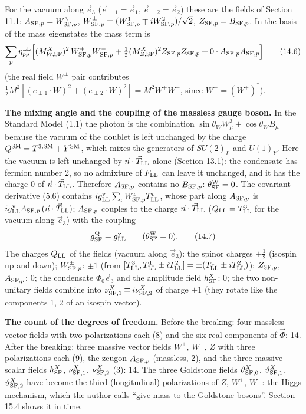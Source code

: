 \documentclass[
  10pt,
]{article}
\begin{document}
For the vacuum along \(\vec e_3\) (\(\vec e_{\perp1}=\vec e_1\),
\(\vec e_{\perp2}=\vec e_2\)) these are the fields of Section 11.1:
\(A_{{\rm SF},p}=W^3_{{\rm SF},p}\),
\(W^\pm_{{\rm SF},p}=(W^1_{{\rm SF},p}\mp iW^2_{{\rm SF},p})/\sqrt2\),
\(Z_{{\rm SF},p}=B_{{\rm SF},p}\). In the basis of the mass eigenstates
the mass term is
\[\sum_p\eta^{\rm LL}_{pp}\Big[(M^X_{W,{\rm SF}})^2\,W^+_{{\rm SF},p}W^-_{{\rm SF},p}+\tfrac12(M^X_{Z,{\rm SF}})^2Z_{{\rm SF},p}Z_{{\rm SF},p}+0\cdot A_{{\rm SF},p}A_{{\rm SF},p}\Big]\tag{14.6}\]
(the real field \(W^\pm\) pair contributes
\(\tfrac12M^2[(e_{\perp1}\cdot W)^2+(e_{\perp2}\cdot W)^2]=M^2W^+W^-\),
since \(W^-=(W^+)^*\)).

\textbf{The mixing angle and the coupling of the massless gauge boson.}
In the Standard Model (1.1) the photon is the combination
\(\sin\theta_WW^3_\mu+\cos\theta_WB_\mu\) because the vacuum of the
doublet is left unchanged by the charge
\(Q^{\rm SM}=T^{3,{\rm SM}}+Y^{\rm SM}\), which mixes the generators of
\(SU(2)_L\) and \(U(1)_Y\). Here the vacuum is left unchanged by
\(\vec n\cdot\vec T_{\rm LL}\) alone (Section 13.1): the condensate has
fermion number 2, so no admixture of \(F_{\rm LL}\) can leave it
unchanged, and it has the charge 0 of \(\vec n\cdot\vec T_{\rm LL}\).
Therefore \(A_{{\rm SF},p}\) contains no \(B_{{\rm SF},p}\):
\(\theta^{\rm W}_{\rm SF}=0\). The covariant derivative (5.6) contains
\(ig^{\rm v}_{\rm LL}\sum_\iota W^\iota_{{\rm SF},p}T^\iota_{\rm LL}\),
whose part along \(A_{{\rm SF},p}\) is
\(ig^{\rm v}_{\rm LL}A_{{\rm SF},p}\,(\vec n\cdot\vec T_{\rm LL})\);
\(A_{{\rm SF},p}\) couples to the charge \(\vec n\cdot\vec T_{\rm LL}\)
(\(Q_{\rm LL}=T^3_{\rm LL}\) for the vacuum along \(\vec e_3\)) with the
coupling
\[g^{\rm Q}_{\rm SF}=g^{\rm v}_{\rm LL}\qquad(\theta^{\rm W}_{\rm SF}=0).\tag{14.7}\]
The charges \(Q_{\rm LL}\) of the fields (vacuum along \(\vec e_3\)):
the spinor charges \(\pm\tfrac12\) (isospin up and down);
\(W^\pm_{{\rm SF},p}\): \(\pm1\) (from
\([T^3_{\rm LL},T^1_{\rm LL}\pm iT^2_{\rm LL}]=\pm(T^1_{\rm LL}\pm iT^2_{\rm LL})\));
\(Z_{{\rm SF},p}\), \(A_{{\rm SF},p}\): 0; the condensate
\(\Phi_0\vec e_3\) and the amplitude field \(h^X_{\rm SF}\): 0; the two
non-unitary fields combine into
\(\nu^X_{{\rm SF},1}\mp i\nu^X_{{\rm SF},2}\) of charge \(\pm1\) (they
rotate like the components 1, 2 of an isospin vector).

\textbf{The count of the degrees of freedom.} Before the breaking: four
massless vector fields with two polarizations each (8) and the six real
components of \(\vec\Phi\): 14. After the breaking: three massive vector
fields \(W^+\), \(W^-\), \(Z\) with three polarizations each (9), the
zeugon \(A_{{\rm SF},p}\) (massless, 2), and the three massive scalar
fields \(h^X_{\rm SF}\), \(\nu^X_{{\rm SF},1}\), \(\nu^X_{{\rm SF},2}\)
(3): 14. The three Goldstone fields \(\vartheta^X_{{\rm SF},0}\),
\(\vartheta^X_{{\rm SF},1}\), \(\vartheta^X_{{\rm SF},2}\) have become
the third (longitudinal) polarizations of \(Z\), \(W^+\), \(W^-\): the
Higgs mechanism, which the author calls ``give mass to the Goldstone
bosons''. Section 15.4 shows it in time.
\end{document}
